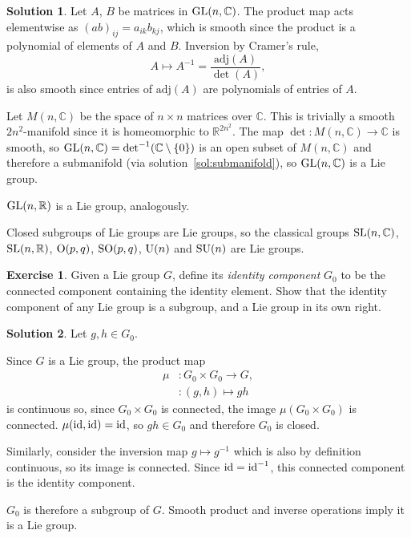 \documentclass[11pt, a4paper]{report}
\theoremstyle{definition}
\newtheorem{exercise}{Exercise}[part]
\newtheorem{solution}{Solution}[part]
\newenvironment{ex}{\begin{exercise}}{\end{exercise}\pagebreak[1]}
\newenvironment{sol}{\begin{solution}}{\end{solution}\pagebreak[3]}
\newcommand*{\GL}{\ensuremath\text{GL}}
\newcommand*{\SL}{\ensuremath\text{SL}}
\renewcommand*{\O}{\ensuremath\text{O}}
\newcommand*{\SO}{\ensuremath\text{SO}}
\newcommand*{\U}{\ensuremath\text{U}}
\newcommand*{\SU}{\ensuremath\text{SU}}
\newcommand*{\id}{\ensuremath\mathop{}\mathopen{}\mathrm{id}}
\begin{document}
\begin{sol}

Let $A$, $B$ be matrices in $\GL(n, \mathbb{C})$. The product map acts elementwise as ${(ab)}_{ij} = a_{ik} b_{kj}$,
which is smooth since the product is a polynomial of elements of $A$ and $B$.
Inversion by Cramer's rule,
\[
    A \mapsto A^{-1} = \frac{\text{adj}(A)}{\det(A)},
\]
is also smooth since entries of $\text{adj}(A)$ are polynomials of entries of $A$.

Let $M(n, \mathbb{C})$ be the space of $n \times n$ matrices over $\mathbb{C}$.
This is trivially a smooth $2n^2$-manifold since it is homeomorphic to $\mathbb{R}^{2n^2}$.
The map $\det : M(n, \mathbb{C}) \to \mathbb{C}$ is smooth, so $\GL(n, \mathbb{C}) = \det^{-1}(\mathbb{C} \setminus \{0\})$ is an open subset of $M(n, \mathbb{C})$ and therefore a submanifold (via solution~\ref{sol:submanifold}), so $\GL(n, \mathbb{C})$ is a Lie group.

$\GL(n, \mathbb{R})$ is a Lie group, analogously.

Closed subgroups of Lie groups are Lie groups, so the classical groups $\SL(n, \mathbb{C})$, $\SL(n, \mathbb{R})$, $\O(p, q)$, $\SO(p, q)$, $\U(n)$ and $\SU(n)$ are Lie groups.

\end{sol}

\begin{ex}

Given a Lie group $G$, define its \emph{identity component} $G_0$ to be the connected component containing the identity element.
Show that the identity component of any Lie group is a subgroup, and a Lie group in its own right.

\end{ex}

\begin{sol}

Let $g, h \in G_0$.

Since $G$ is a Lie group, the product map
\begin{align*}
    \mu &: G_0 \times G_0 \to G, \\
        &: (g, h) \mapsto gh
\end{align*}
is continuous so, since $G_0 \times G_0$ is connected, the image $\mu(G_0 \times G_0)$ is connected. $\mu(\id, \id) = \id$, so $gh \in G_0$ and therefore $G_0$ is closed.

Similarly, consider the inversion map $g \mapsto g^{-1}$ which is also by definition continuous, so its image is connected. Since $\id = \id^{-1}$, this connected component is the identity component.

$G_0$ is therefore a subgroup of $G$. Smooth product and inverse operations imply it is a Lie group.

\end{sol}
\end{document}
